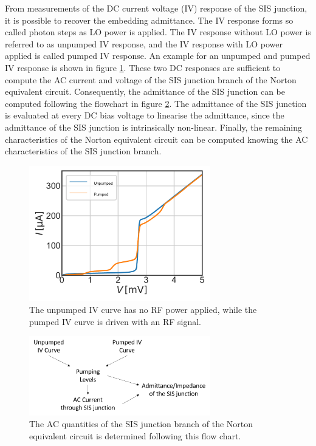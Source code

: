 \documentclass[]{article}
\begin{document}
From measurements of the DC current voltage (IV) response of the SIS junction, it is possible to recover the embedding admittance. The IV response forms so called photon steps as LO power is applied. The IV response without LO power is referred to as unpumped IV response, and the IV response with LO power applied is called pumped IV response. An example for an unpumped and pumped IV response is shown in  figure \ref{fig:Unpumped_Pumped}. These two DC responses are sufficient to compute the AC current and voltage of the SIS junction branch of the Norton equivalent circuit. Consequently, the admittance of the SIS junction can be computed  following the flowchart in figure \ref{fig:FlowchartSISJunctionBranch}. The admittance of the SIS junction is evaluated at every DC bias voltage to linearise the admittance, since the admittance of the SIS junction is intrinsically non-linear. Finally, the remaining characteristics of the Norton equivalent circuit can be computed knowing the AC characteristics of the SIS junction branch.

\begin{figure}
	\centering
	\includegraphics[width=0.7\textwidth]{./../Mixer_Unit_Test/2020_01_12_FixedMask/Unpumped_Pumped.pdf}
	\caption{The unpumped IV curve has no RF power applied, while the pumped IV curve is driven with an RF signal. }
	\label{fig:Unpumped_Pumped}
\end{figure}

\begin{figure}
	\centering
	\includegraphics[width=0.7\textwidth]{./Images/Impedance_Recovery_Flowchart_Part1.png}
	\caption{The AC quantities of the SIS junction branch of the Norton equivalent circuit is determined following this flow chart.}
	\label{fig:FlowchartSISJunctionBranch}
\end{figure}
\end{document}
